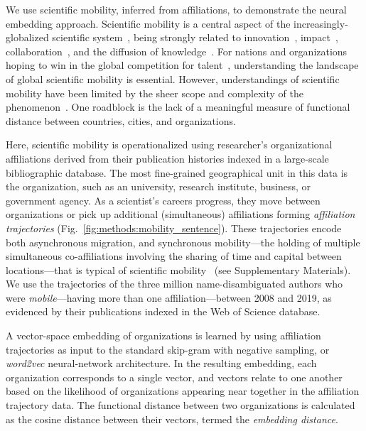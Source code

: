 \documentclass[12pt]{article} %
\begin{document}
We use scientific mobility, inferred from affiliations, to demonstrate the neural embedding approach. 
Scientific mobility is a central aspect of the increasingly-globalized scientific system~\autocite{czaika2018globalisation, altbach2004globalization}, being strongly related to innovation~\autocite{braunerhjelm2020labor, kaiser2018innovation, armano2017innovation}, impact~\autocite{sugimoto2017mostimpact, petersen2018multiscale, franzoni2014advantage}, collaboration~\autocite{rodrigues2016mobility}, and the diffusion of knowledge~\autocite{braunerhjelm2020labor, azoulay2011diffusion, morgan2018prestige}.
For nations and organizations hoping to win in the global competition for talent~\autocite{box2008competition}, understanding the landscape of global scientific mobility is essential. 
However, understandings of scientific mobility have been limited by the sheer scope and complexity of the phenomenon~\autocite{robinson2019mobility, vannoorden2012mobility, deville2014career, ackers2008mobility, scott2015dynamics}.
One roadblock is the lack of a meaningful measure of functional distance between countries, cities, and organizations. 

Here, scientific mobility is operationalized using researcher's organizational affiliations derived from their publication histories indexed in a large-scale bibliographic database. 
The most fine-grained geographical unit in this data is the organization, such as an university, research institute, business, or government agency.
As a scientist's careers progress, they move between organizations or pick up additional (simultaneous) affiliations forming \textit{affiliation trajectories} (Fig.~\ref{fig:methods:mobility_sentence}).
These trajectories encode both asynchronous migration, and synchronous mobility---the holding of multiple simultaneous co-affiliations involving the sharing of time and capital between locations---that is typical of scientific mobility~\autocite{rodrigues2016mobility, markova2016synchronous, sugimoto2017mostimpact} (see Supplementary Materials).
We use the trajectories of the three million name-disambiguated authors who were \textit{mobile}---having more than one affiliation---between 2008 and 2019, as evidenced by their publications indexed in the Web of Science database.

A vector-space embedding of organizations is learned by using affiliation trajectories as input to the standard skip-gram with negative sampling, or \textit{word2vec} neural-network architecture.
In the resulting embedding, each organization corresponds to a single vector, and vectors relate to one another based on the likelihood of organizations appearing near together in the affiliation trajectory data. 
The functional distance between two organizations is calculated as the cosine distance between their vectors, termed the \textit{embedding distance}.
\end{document}
